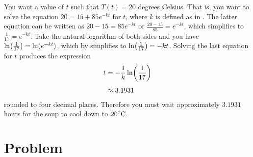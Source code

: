\documentclass[a4paper,oneside,12pt]{article}
\begin{document}
{\begin{solution}
You want a value of $t$ such that $T(t) = 20$ degrees Celsius.  That
is, you want to solve the equation $20 = 15 + 85 e^{-kt}$ for $t$,
where $k$ is defined as in
.  The latter
equation can be written as $20 - 15 = 85 e^{-kt}$ or
$\frac{20 - 15}{85} = e^{-kt}$, which simplifies to
$\frac{1}{17} = e^{-kt}$.  Take the natural logarithm of both sides
and you have $\ln \parenthesis*{\frac{1}{17}} = \ln (e^{-kt})$, which
by
simplifies to $\ln \parenthesis*{\frac{1}{17}} = -kt$.  Solving the
last equation for $t$ produces the expression
\begin{align*}
t
&=
-\frac{1}{k} \ln \parenthesis*{\frac{1}{17}} \\[4pt]
&\approx
3.1931
\end{align*}
rounded to four decimal places.  Therefore you must wait approximately
$3.1931$ hours for the soup to cool down to ${20}^{\circ}\textrm{C}$.
\end{solution}
}{}


\newpage

\section*{Problem}
\end{document}
